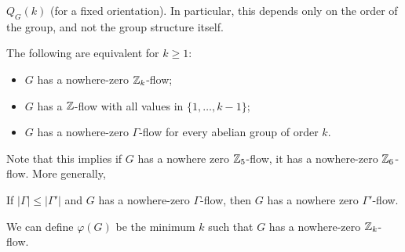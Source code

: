 \documentclass[main.tex]{subfiles}
\begin{document}
$Q_G(k)$ (for a fixed orientation).
In particular, this depends only on the order of the group, and not the group
structure itself.
\begin{corollary}
  The following are equivalent for $k\geq 1$:
  \begin{itemize}
    \item $G$ has a nowhere-zero $\mathbb Z_k$-flow;
    \item $G$ has a $\mathbb Z$-flow with all values in $\{1,\ldots,k-1\}$;
    \item $G$ has a nowhere-zero $\Gamma$-flow for every abelian group of order $k$.
  \end{itemize}
\end{corollary}
Note that this implies if $G$ has a nowhere zero $\mathbb Z_5$-flow, it has a
nowhere-zero $\mathbb Z_6$-flow.
More generally,
\begin{corollary}
  If $|\Gamma|\leq|\Gamma'|$ and $G$ has a nowhere-zero $\Gamma$-flow,
  then $G$ has a nowhere zero $\Gamma'$-flow.
\end{corollary}
We can define $\varphi(G)$ be the minimum $k$ such that $G$ has a nowhere-zero
$\mathbb Z_k$-flow.
\end{document}
